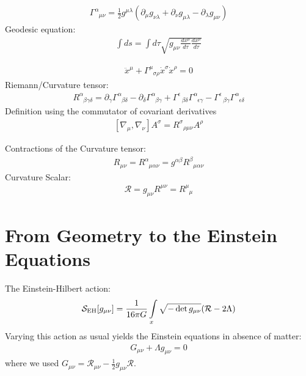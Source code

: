  
\begin{align}
\Gamma_{\phantom{\alpha}\mu \nu}^{\alpha}=\frac{1}{2} g^{\mu \lambda}\left(\partial_{\mu} g_{\nu \lambda}+\partial_{\nu} g_{\mu \lambda}-\partial_{\lambda} g_{\mu \nu}\right)	
\end{align}
Geodesic equation:
\begin{align}
	\int d s=\int d \tau \sqrt{g_{\mu \nu} \frac{d x^{\mu}}{d \tau} \frac{d x^{\mu}}{d \tau}}
\end{align}

\begin{align}
	\ddot{x}^{\mu}+\Gamma_{\phantom{\mu}\sigma \rho}^{\mu} \dot{x}^{\sigma} \dot{x}^{\rho}=0
\end{align}
Riemann/Curvature tensor:
\begin{align}
	R_{\phantom{\alpha}\beta \gamma \delta}^{\alpha}=\partial_{\gamma} \Gamma_{\phantom{\alpha}\beta \delta}^{\alpha}-\partial_{\delta} \Gamma_{\phantom{\alpha}\beta \gamma}^{\alpha}+\Gamma_{\phantom{\alpha}\beta \delta}^{\epsilon} \Gamma_{\phantom{\alpha}\epsilon \gamma}^{\alpha}-\Gamma_{\phantom{\alpha}\beta \gamma}^{\epsilon} \Gamma_{\phantom{\alpha}\epsilon \delta}^{\alpha}
\end{align}
Definition using the commutator of covariant derivatives
\begin{align}
	\left[\nabla_{\mu}, \nabla_{\nu}\right] A^{\sigma}=R_{\phantom{\alpha}\rho \mu \nu}^{\sigma} A^{\rho} \label{eqn:Riemann}
\end{align}

Contractions of the Curvature tensor:
\begin{align}
	R_{\mu\nu} = R^{\alpha}_{\phantom{\alpha}\mu\alpha\nu} = g^{\alpha\beta} R^{\beta}_{\phantom{\alpha}\mu\alpha\nu}
\end{align}
Curvature Scalar:
\begin{align}
\mathcal{R} = g_{\mu\nu}R^{\mu\nu} = R^{\mu}_{\phantom{\mu}\mu}
\end{align}






\section{From Geometry to the Einstein Equations}


The Einstein-Hilbert action:
\begin{align}
	\mathcal{S}_{\text{EH}}[g_{\mu\nu}] = \frac{1}{16\pi G} \int\limits_x \sqrt{-\operatorname{det}g_{\mu\nu}} (\mathcal{R} - 2\Lambda)
\end{align}
Varying this action as usual yields the Einstein equations in absence of matter:
\begin{align}
	G_{\mu\nu} + \Lambda g_{\mu\nu} = 0
\end{align}
where we used $G_{\mu\nu} = \mathcal{R}_{\mu\nu} - \frac{1}{2}g_{\mu\nu}\mathcal{R}$. \\

